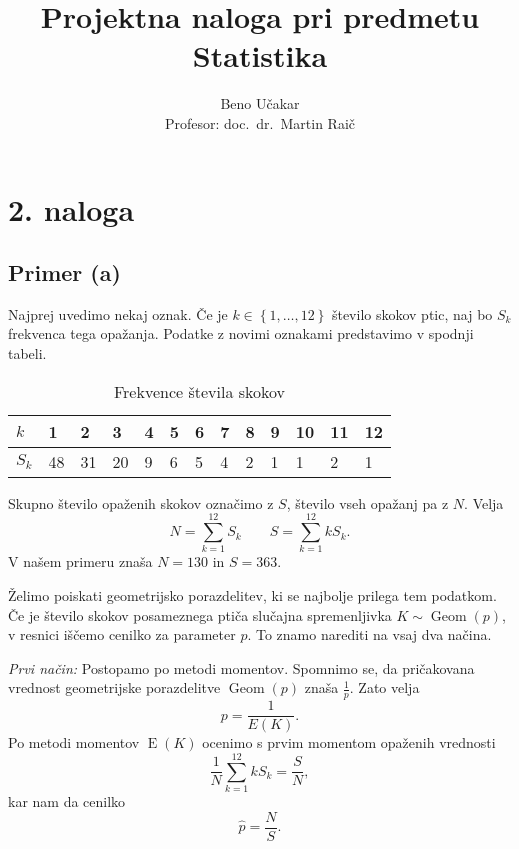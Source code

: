 \documentclass[a4paper,11pt]{article}
\newcommand{\set}[1]{\left\{#1\right\}} %
\DeclareMathOperator{\E}{E}
\DeclareMathOperator{\Geom}{Geom}
\begin{document}
\title{Projektna naloga pri predmetu Statistika}
\author{Beno Učakar \\ Profesor: doc.~dr.~Martin Raič}
\date{}


\maketitle





\section{2. naloga}

\subsection{Primer (a)}

Najprej uvedimo nekaj oznak. 
Če je $k \in \set{1, \ldots, 12}$ število skokov ptic, naj bo $S_k$ frekvenca tega opažanja.
Podatke z novimi oznakami predstavimo v spodnji tabeli.
\begin{table}[h]
    \centering
    \begin{tabular}{|l|l|l|l|l|l|l|l|l|l|l|l|l|}
    \hline
    $k$ & 1 & 2 & 3 & 4 & 5 & 6 & 7 & 8 & 9 & 10 & 11 & 12 \\ \hline
    $S_k$ & 48 & 31 & 20 & 9 & 6 & 5 & 4 & 2 & 1 & 1 & 2 & 1 \\ \hline
    \end{tabular}
    \caption{Frekvence števila skokov}
    \label{freq}
\end{table}
Skupno število opaženih skokov označimo z $S$, število vseh opažanj pa z $N$.
Velja
\[N = \sum_{k=1}^{12} S_k \qquad S = \sum_{k=1}^{12} k S_k.\]
V našem primeru znaša $N = 130$ in $S = 363$.

Želimo poiskati geometrijsko porazdelitev, ki se najbolje prilega tem podatkom. 
Če je število skokov posameznega ptiča slučajna spremenljivka $K \sim \Geom(p)$, 
v resnici iščemo cenilko za parameter $p$.
To znamo narediti na vsaj dva načina.

\emph{Prvi način:} Postopamo po metodi momentov. 
Spomnimo se, da pričakovana vrednost geometrijske porazdelitve $\Geom(p)$ znaša $\frac{1}{p}$.
Zato velja
\[p = \frac{1}{E(K)}.\]
Po metodi momentov $\E(K)$ ocenimo s prvim momentom opaženih vrednosti 
\[\frac{1}{N} \sum_{k=1}^{12} k S_k = \frac{S}{N},\]
kar nam da cenilko
\[\hat{p} = \frac{N}{S}.\]
\end{document}
